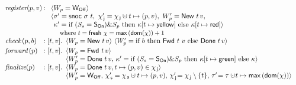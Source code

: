 \documentclass[a4paper,UKenglish]{lipics-v2016}
\newcommand{\dom}[1]{\mathsf{dom}(#1)}
\newcommand{\dotcup}{\ensuremath{\mathaccent\cdot\cup}}
\newcommand{\aux}[1]{\textit{#1}}
\newcommand{\selfsub}{\mathsf{s}}
\newcommand{\jointsub}{\mathsf{j}}
\newcommand{\hist}{\chi}
\newcommand{\histS}{\hist_{\, \selfsub}}
\newcommand{\histJ}{\hist_{\, \jointsub}}
\newcommand{\hunion}{\mathbin{\dotcup}}
\newcommand{\hpts}{\mapsto}
\newcommand{\ldot}{\mathord{.}\,}
\def\ordlist{\sigma}
\newcommand{\E}{\tau}
\newcommand{\C}{\kappa}
\def\ordlistP{\sigma'}
\newcommand{\histSP}{\hist_{\, \selfsub}'}
\newcommand{\histJP}{\hist_{\, \jointsub}'}
\newcommand{\wppP}{W_p'}
\newcommand{\wInit}{\mathsf{W_{Off}}}
\newcommand{\wWrite}{\mathsf{New}}
\newcommand{\wDirty}{\mathsf{Fwd}}
\newcommand{\wClean}{\mathsf{Done}}
\newcommand{\sOn}{\mathsf{S_{On}}}
\theoremstyle{definition}
\begin{document}
{
\begin{figure}[t]
%
\centering
\small
\[
\begin{array}{l@{\, :\ } l}
 \aux{register}(p,v) & 
  \begin{array}[t]{l}
   \langle \wpp = \wInit\rangle\\ 
   \langle\ordlistP = \mathsf{snoc}\ {\ordlist}\ t,\
     \histJP = \histJ \hunion t \hpts (p,v),\ \wppP = \wWrite\ t\, v,\\
   \phantom{\langle} \C' = \textrm{if}\ (\sss = \sOn) \& \spp\
                    \textrm{then}\ \C[t \mapsto \mathsf{yellow}]\
                    \textrm{else}\ \C[t \mapsto \mathsf{red}]\rangle \\
   \ \mbox{\small{where $t = \mathsf{fresh}\ \hist = \mathsf{max}\, (\dom{\hist})+1$}}
  \end{array} \\[2.5pt]
  \aux{check}\,(p,b) & [t, v]\ldot
  \!\begin{array}[t]{l}
  \langle\wpp = \wWrite\ t\, v\rangle\ 
  \langle\wppP = \textrm{if}\ b\
  \textrm{then}\ \wDirty\ t\, \,v\ \textrm{else}\ \wClean\ t\, v\rangle
 \end{array}\\[2.5pt]
  \aux{forward}\,(p) & [t, v]\ldot
  \!\begin{array}[t]{l}
   \langle\wpp = \wDirty\ t\,v \rangle\\ 
   \langle\wppP = \wClean\ t\,v,\, %
   \C' = \textrm{if}\ (\sss=\sOn) \& \spp\ \textrm{then}\ \C[t \mapsto \mathsf{green}]\ \textrm{else}\ \C\rangle
  \end{array}\\[2.5 pt]
  \aux{finalize}(p) & [t, v]\ldot
  \!\begin{array}[t]{l}
  \langle\wpp = \wClean\ t\, v, %
  t \hpts (p, v) \in \histJ \rangle\\
  \langle\wppP = \wInit,\, \histSP = \histS \hunion t \hpts (p,v),\, %
  \histJP\! = \histJ\setminus\{t\},\,
  \E'\! = \E \hunion\! t \hpts \mathsf{max}\, (\dom{\hist}) \rangle
 \end{array}
\end{array}
\]

\end{figure}}
\end{document}
